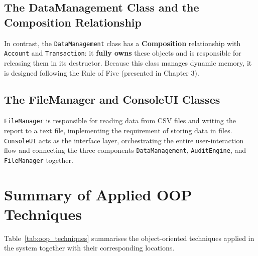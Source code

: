     \subsection{The DataManagement Class and the Composition Relationship}
    In contrast, the \texttt{DataManagement} class has a \textbf{Composition} relationship with \texttt{Account} and \texttt{Transaction}: it \textbf{fully owns} these objects and is responsible for releasing them in its destructor. Because this class manages dynamic memory, it is designed following the Rule of Five (presented in Chapter 3).

    \subsection{The FileManager and ConsoleUI Classes}
    \texttt{FileManager} is responsible for reading data from CSV files and writing the report to a text file, implementing the requirement of storing data in files. \texttt{ConsoleUI} acts as the interface layer, orchestrating the entire user-interaction flow and connecting the three components \texttt{DataManagement}, \texttt{AuditEngine}, and \texttt{FileManager} together.

\section{Summary of Applied OOP Techniques}
    Table~\ref{tab:oop_techniques} summarises the object-oriented techniques applied in the system together with their corresponding locations.

